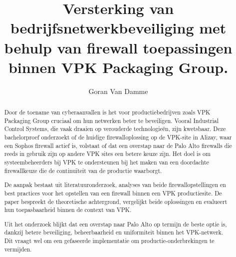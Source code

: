 \documentclass[a0,portrait]{hogent-poster}
\title{Versterking van bedrijfsnetwerkbeveiliging met behulp van firewall toepassingen binnen VPK Packaging Group.}
\author{Goran Van Damme}
\begin{document}
\maketitle

\begin{abstract}
Door de toename van cyberaanvallen is het voor productiebedrijven zoals VPK Packaging Group cruciaal om hun netwerken beter te beveiligen. Vooral Industrial Control Systems, die vaak draaien op verouderde technologieën, zijn kwetsbaar. Deze bachelorproef onderzoekt of de huidige firewalloplossing op de VPK-site in Alizay, waar een Sophos firewall actief is, volstaat of dat een overstap naar de Palo Alto firewalls die reeds in gebruik zijn op andere VPK sites een betere keuze zijn. Het doel is om systeembeheerders bij VPK te ondersteunen bij het maken van een doordachte firewallkeuze die de continuïteit van de productie waarborgt.

De aanpak bestaat uit literatuuronderzoek, analyses van beide firewallopstellingen en best practices voor het opstellen van een firewall binnen een VPK productiesite. De paper bespreekt de theoretische achtergrond, vergelijkt beide oplossingen en evalueert hun toepasbaarheid binnen de context van VPK.

Uit het onderzoek blijkt dat een overstap naar Palo Alto op termijn de beste optie is, dankzij betere beveiliging, beheerbaarheid en uniformiteit binnen het VPK-netwerk. Dit vraagt wel om een gefaseerde implementatie om productie-onderbrekingen te vermijden.
\end{abstract}
\end{document}
